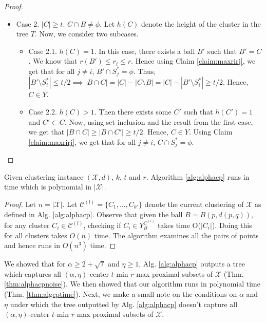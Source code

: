 \documentclass[anon,12pt]{colt2016} %
\newcommand{\mc}{\mathcal}
\begin{document}
\begin{proof}
\begin{itemize}[nolistsep]
\item Case 2. $|C|\ge t$. $C \cap B \neq \phi$. Let $h(C)$ denote the height of the cluster in the tree $T$. Now, we consider two subcases.
\begin{itemize}
\renewcommand\labelitemii{$\circ$}
\item Case 2.1. $h(C) = 1$. In this case, there exists a ball $B'$ such that $B' = C$. We know that $r(B') \le r_i \le r$. Hence using Claim \ref{claim:maxrirj}, we get that for all $j \neq i$, $B' \cap S_j^* = \phi$. Thus, $|B'\setminus S_i^*| \le t/2 \implies |B\cap C| = |C| - |C\setminus B| = |C| - |B'\setminus S_i^*| \ge t/2$. Hence, $C \in Y$.

\item Case 2.2. $h(C) > 1$. Then there exists some $C'$ such that $h(C') = 1$ and $C' \subset C$. Now, using set inclusion and the result from the first case, we get that $|B\cap C| \ge |B\cap C'| \ge t/2$. Hence, $C \in Y$. Using Claim \ref{claim:maxrirj}, we get that for all $j \neq i$, $C \cap S_j^* = \phi$.
\end{itemize} 
\end{itemize}
\end{proof}

\begin{theorem}
\label{thm:algcptime}
Given clustering instance $(\mc X, d)$, $k$, $t$ and $r$. Algorithm \ref{alg:alphacp} runs in time which is polynomial in $|\mc X|$.
\end{theorem}

\begin{proof}
Let $n = |\mc X|$. Let $\mc C^{(l)} =\{C_1, \ldots, C_{k'}\}$ denote the current clustering of $\mc X$ as defined in Alg. \ref{alg:alphacp}. Observe that given the ball $B = B(p, d(p, q))$, for any cluster $C_i \in \mc C^{(l)}$, checking if $C_i \in Y_B^{C^{(l)}}$ takes time O($|C_i|$). Doing this for all clusters takes $O(n)$ time. The algorithm examines all the pairs of points and hence runs in $O(n^3)$ time.
\end{proof}

We showed that for $\alpha \ge 2 + \sqrt{7}$ and $\eta \ge 1$, Alg. \ref{alg:alphacp} outputs a tree which captures all $(\alpha, \eta)$-center $t$-min $r$-max proximal subsets of $\mc X$ (Thm. \ref{thm:alphacpnoise}). We then showed that our algorithm runs in polynomial time (Thm. \ref{thm:algcptime}). Next, we make a small note on the conditions on $\alpha$ and $\eta$ under which the tree outputted by Alg. \ref{alg:alphacp} doesn't capture all $(\alpha, \eta)$-center $t$-min $r$-max proximal subsets of $\mc X$. 
\end{document}
